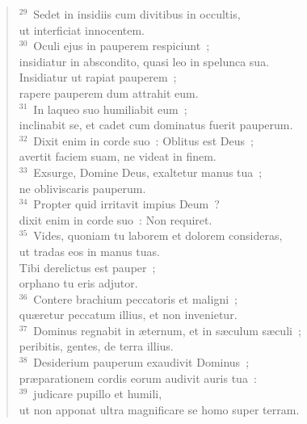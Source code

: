 \begin{flushleft}
\begin{verse}
${}^{29}$~Sedet in insidiis cum divitibus in occultis,\\ ut interficiat innocentem.\\
${}^{30}$~Oculi ejus in pauperem respiciunt~;\\ insidiatur in abscondito, quasi leo in spelunca sua.\\ Insidiatur ut rapiat pauperem~;\\ rapere pauperem dum attrahit eum.\\
${}^{31}$~In laqueo suo humiliabit eum~;\\ inclinabit se, et cadet cum dominatus fuerit pauperum.\\
${}^{32}$~Dixit enim in corde suo~: Oblitus est Deus~;\\ avertit faciem suam, ne videat in finem.\\
${}^{33}$~Exsurge, Domine Deus, exaltetur manus tua~;\\ ne obliviscaris pauperum.\\
${}^{34}$~Propter quid irritavit impius Deum~?\\ dixit enim in corde suo~: Non requiret.\\
${}^{35}$~Vides, quoniam tu laborem et dolorem consideras,\\ ut tradas eos in manus tuas.\\ Tibi derelictus est pauper~;\\ orphano tu eris adjutor.\\
${}^{36}$~Contere brachium peccatoris et maligni~;\\ qu\ae retur peccatum illius, et non invenietur.\\
${}^{37}$~Dominus regnabit in \ae ternum, et in s\ae culum s\ae culi~;\\ peribitis, gentes, de terra illius.\\
${}^{38}$~Desiderium pauperum exaudivit Dominus~;\\ pr\ae parationem cordis eorum audivit auris tua~:\\
${}^{39}$~judicare pupillo et humili,\\ ut non apponat ultra magnificare se homo super terram.\end{verse}\end{flushleft}



